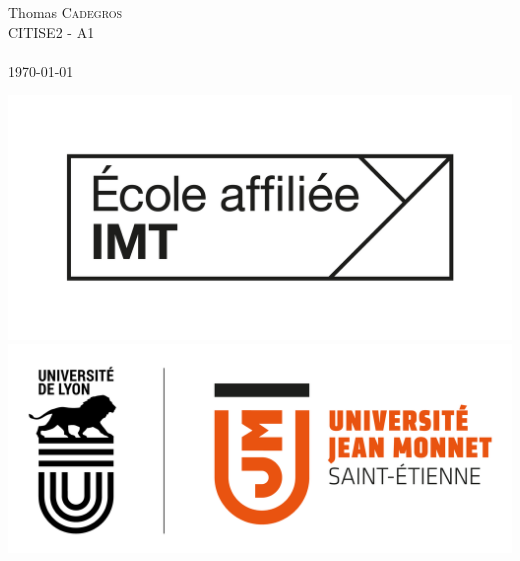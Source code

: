 \begin{titlepage}
\begin{center}

        Thomas \textsc{Cadegros}\\
        CITISE2 - A1\\[1cm]


        \version \\
        \today
        \vfill
        \hfill
    
    \end{center}

        \includegraphics[scale=0.07]{image/IMT_Affiliee_logo_Noir.png}
        \includegraphics[scale=0.28]{image/Logo_UJM.png}

    
    
\end{titlepage}
